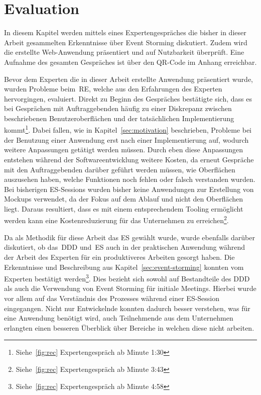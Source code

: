 \chapter{Evaluation}\label{ch:evaluation}
In diesem Kapitel werden mittels eines Expertengespräches die bisher in dieser Arbeit gesammelten Erkenntnisse über Event Storming diskutiert.
Zudem wird die erstellte Web-Anwendung präsentiert und auf Nutzbarkeit überprüft.
Eine Aufnahme des gesamten Gespräches ist über den QR-Code im Anhang erreichbar.

Bevor dem Experten die in dieser Arbeit erstellte Anwendung präsentiert wurde, wurden Probleme beim~\ac{RE}, welche aus den Erfahrungen des Experten
hervorgingen, evaluiert.
Direkt zu Beginn des Gespräches bestätigte sich, dass es bei Gesprächen mit Auftraggebenden häufig zu einer Diskrepanz zwischen beschriebenen Benutzeroberflächen und der
tatsächlichen Implementierung kommt\footnote{Siehe~\ref{fig:rec} Expertengespräch ab Minute 1:30}.
Dabei fallen, wie in Kapitel~\ref{sec:motivation} beschrieben, Probleme bei der Benutzung einer Anwendung erst nach einer Implementierung auf, wodurch
weitere Anpassungen getätigt werden müssen.
Durch eben diese Anpassungen entstehen während der Softwareentwicklung weitere Kosten, da erneut Gespräche mit den Auftraggebenden darüber geführt werden müssen,
wie Oberflächen auszusehen haben, welche Funktionen noch fehlen oder falsch verstanden wurden.
Bei bisherigen \ac{ES}-Sessions wurden bisher keine Anwendungen zur Erstellung von Mockups verwendet, da der Fokus auf dem Ablauf und nicht den Oberflächen liegt.
Daraus resultiert, dass es mit einem entsprechendem Tooling ermöglicht werden kann eine Kostenreduzierung für das Unternehmen zu erreichen\footnote{Siehe~\ref{fig:rec} Expertengespräch ab Minute  3:43}.

Da als Methodik für diese Arbeit das \ac{ES} gewählt wurde, wurde ebenfalls darüber diskutiert, ob das~\ac{DDD} und~\ac{ES} auch in der praktischen
Anwendung während der Arbeit des Experten für ein produktiveres Arbeiten gesorgt haben.
Die Erkenntnisse und Beschreibung aus Kapitel~\ref{sec:event-storming} konnten vom Experten bestätigt werden\footnote{Siehe~\ref{fig:rec} Expertengespräch ab Minute  4:58}.
Dies bezieht sich sowohl auf Bestandteile des \ac{DDD} als auch die Verwendung von Event Storming für initiale Meetings.
Hierbei wurde vor allem auf das Verständnis des Prozesses während einer \ac{ES}-Session eingegangen.
Nicht nur Entwickelnde konnten dadurch besser verstehen, was für eine Anwendung benötigt wird, auch Teilnehmende aus dem Unternehmen erlangten
einen besseren Überblick über Bereiche in welchen diese nicht arbeiten.

